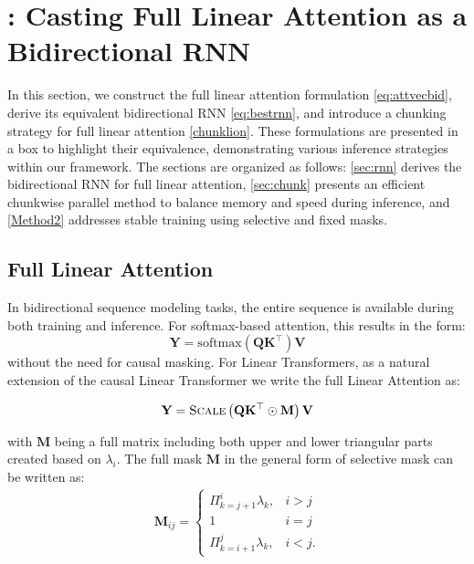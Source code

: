 

\section{{\lion: Casting Full Linear Attention as a Bidirectional RNN}} \label{method1}  

In this section, we construct the full linear attention formulation \cref{eq:attvecbid}, derive its equivalent bidirectional RNN \cref{eq:bestrnn}, and introduce a chunking strategy for full linear attention \cref{chunklion}. These formulations are presented in a box to highlight their equivalence, demonstrating various inference strategies within our framework. The sections are organized as follows: \cref{sec:rnn} derives the bidirectional RNN for full linear attention, \cref{sec:chunk} presents an efficient chunkwise parallel method to balance memory and speed during inference, and \cref{Method2} addresses stable training using selective and fixed masks.

\subsection{Full Linear Attention}

In bidirectional sequence modeling tasks, the entire sequence is available during both training and inference. For softmax-based attention, this results in the form:
\[\mathbf{Y} = \text{softmax}\left(\mathbf{Q} \mathbf{K}^\top \right) \mathbf{V}\]
without the need for causal masking. For Linear Transformers, as a natural extension of the causal Linear Transformer we write the full Linear Attention as:

\begin{tcolorbox}[colback=gray!2!white, colframe=black, boxrule=0.2mm, arc=2mm ,boxsep=0.1pt, left=0.0pt, right=0.0pt, top=0pt, bottom=0.5pt]
\begin{equation}
\label{eq:attvecbid}
    \mathbf{Y} = \textsc{Scale}\left(\mathbf{Q} \mathbf{K}^\top \odot \mathbf{M} \right) \mathbf{V} %
\end{equation}
\end{tcolorbox}

with $\mathbf{M}$ being a full matrix including both upper and lower triangular parts created based on ${\lambda}_i$. The full mask $\mathbf{M}$ in the general form of selective mask can be written as:
\begin{align}
\label{eq:maskselbir}
     \mathbf{M}_{ij} = 
    \begin{cases} 
    \Pi_{k=j+1}^{i}{\lambda_k}, & i > j  \\
    1 & i=j\\ 
    \Pi_{k=i+1}^{j}{\lambda_k}, & i < j.
\end{cases} 
\end{align}

